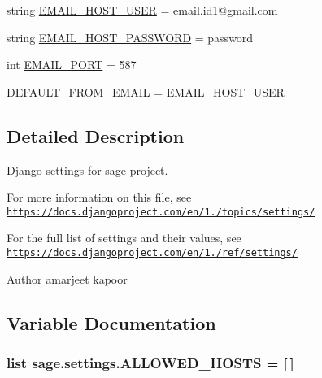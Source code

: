 \begin{DoxyCompactItemize}
\item 
string \hyperlink{namespacesage_1_1settings_a9c01855359753a3c3f517341806347c2}{E\+M\+A\+I\+L\+\_\+\+H\+O\+S\+T\+\_\+\+U\+S\+E\+R} = \textquotesingle{}email.\+id1@gmail.\+com\textquotesingle{}
\item 
string \hyperlink{namespacesage_1_1settings_a66e7a16ed6b0df5716a6579fcba949a6}{E\+M\+A\+I\+L\+\_\+\+H\+O\+S\+T\+\_\+\+P\+A\+S\+S\+W\+O\+R\+D} = \textquotesingle{}password\textquotesingle{}
\item 
int \hyperlink{namespacesage_1_1settings_a3fe927460bba6408b5df39fa8a10d367}{E\+M\+A\+I\+L\+\_\+\+P\+O\+R\+T} = 587
\item 
\hyperlink{namespacesage_1_1settings_a6517c4f93850d63e2bdbe7040ad0e2ff}{D\+E\+F\+A\+U\+L\+T\+\_\+\+F\+R\+O\+M\+\_\+\+E\+M\+A\+I\+L} = \hyperlink{namespacesage_1_1settings_a9c01855359753a3c3f517341806347c2}{E\+M\+A\+I\+L\+\_\+\+H\+O\+S\+T\+\_\+\+U\+S\+E\+R}
\end{DoxyCompactItemize}


\subsection{Detailed Description}
Django settings for sage project. 

For more information on this file, see \href{https://docs.djangoproject.com/en/1.7/topics/settings/}{\tt https\+://docs.\+djangoproject.\+com/en/1./topics/settings/}

For the full list of settings and their values, see \href{https://docs.djangoproject.com/en/1.7/ref/settings/}{\tt https\+://docs.\+djangoproject.\+com/en/1./ref/settings/} \begin{DoxyAuthor}{Author}
amarjeet kapoor 
\end{DoxyAuthor}


\subsection{Variable Documentation}
\hypertarget{namespacesage_1_1settings_a2eb98def792cf73bbc5884024afc5602}{}
\subsubsection[{A\+L\+L\+O\+W\+E\+D\+\_\+\+H\+O\+S\+T\+S}]{\setlength{\rightskip}{0pt plus 5cm}list sage.\+settings.\+A\+L\+L\+O\+W\+E\+D\+\_\+\+H\+O\+S\+T\+S = \mbox{[}$\,$\mbox{]}}\label{namespacesage_1_1settings_a2eb98def792cf73bbc5884024afc5602}


